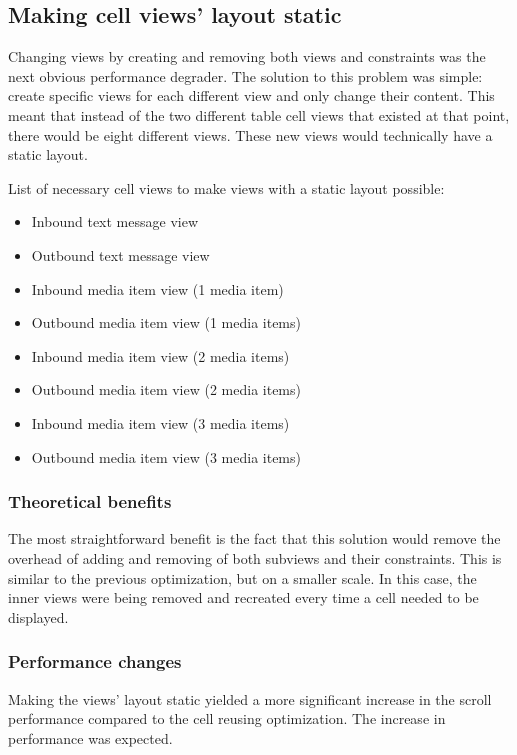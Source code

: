 \documentclass[a4paper,12pt]{article}
\begin{document}
\subsection{Making cell views' layout static}
Changing views by creating and removing both views and constraints was the next obvious performance degrader. The solution to this problem was simple: create specific views for each different view and only change their content. This meant that instead of the two different table cell views that existed at that point, there would be eight different views. These new views would technically have a static layout.

List of necessary cell views to make views with a static layout possible:
\begin{itemize}
  \item Inbound text message view
  \item Outbound text message view
  \item Inbound media item view (1 media item)
  \item Outbound media item view (1 media items)
  \item Inbound media item view (2 media items)
  \item Outbound media item view (2 media items)
  \item Inbound media item view (3 media items)
  \item Outbound media item view (3 media items)
\end{itemize}

\subsubsection*{Theoretical benefits}
The most straightforward benefit is the fact that this solution would remove the overhead of adding and removing of both subviews and their constraints. This is similar to the previous optimization, but on a smaller scale. In this case, the inner views were being removed and recreated every time a cell needed to be displayed. 

\subsubsection*{Performance changes}
Making the views' layout static yielded a more significant increase in the scroll performance compared to the cell reusing optimization. The increase in performance was expected.

\end{document}
